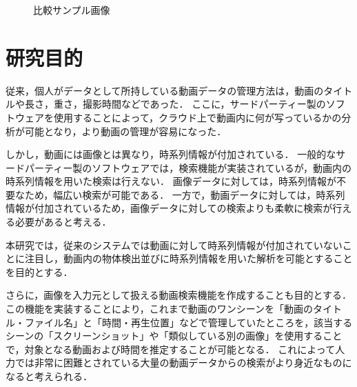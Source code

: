 \documentclass[a4j,12pt,dvipdfmx]{jreport}
\begin{document}
\vspace{2zh}
\begin{figure}[htbp]
  \centering
  \caption{\label{fig:hikaku} 比較サンプル画像}
\end{figure}

\clearpage
\section{研究目的}
従来，個人がデータとして所持している動画データの管理方法は，動画のタイトルや長さ，重さ，撮影時間などであった．
ここに，サードパーティー製のソフトウェアを使用することによって，クラウド上で動画内に何が写っているかの分析が可能となり，より動画の管理が容易になった．

しかし，動画には画像とは異なり，時系列情報が付加されている．
一般的なサードパーティー製のソフトウェアでは，検索機能が実装されているが，動画内の時系列情報を用いた検索は行えない．
画像データに対しては，時系列情報が不要なため，幅広い検索が可能である．
一方で，動画データに対しては，時系列情報が付加されているため，画像データに対しての検索よりも柔軟に検索が行える必要があると考える．

本研究では，従来のシステムでは動画に対して時系列情報が付加されていないことに注目し，動画内の物体検出並びに時系列情報を用いた解析を可能とすることを目的とする．

さらに，画像を入力元として扱える動画検索機能を作成することも目的とする．
この機能を実装することにより，これまで動画のワンシーンを「動画のタイトル・ファイル名」と「時間・再生位置」などで管理していたところを，該当するシーンの「スクリーンショット」や「類似している別の画像」を使用することで，対象となる動画および時間を推定することが可能となる．
これによって人力では非常に困難とされている大量の動画データからの検索がより身近なものになると考えられる．

\clearpage
\end{document}
